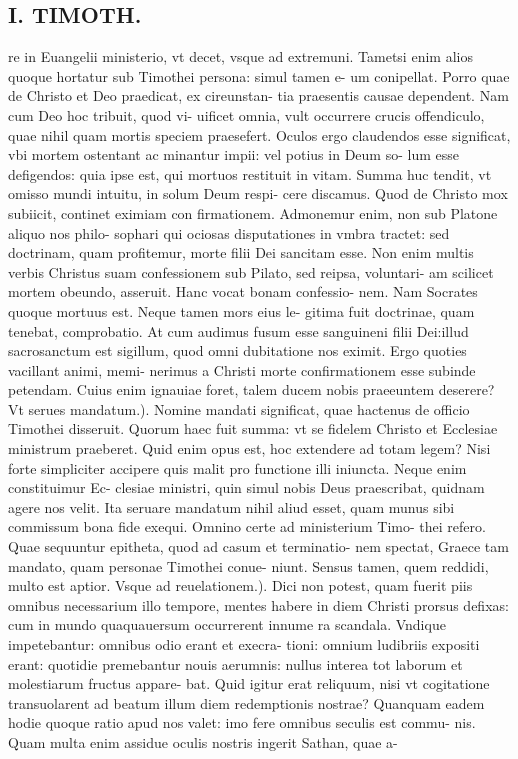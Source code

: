 \documentclass{article}
\begin{document}
\begin{pages}
\section*{I. TIMOTH. }
\marginpar{[ p.80 ]}\pstart re in Euangelii ministerio, vt decet, vsque ad extremuni. Tametsi enim alios quoque hortatur sub Timothei persona: simul tamen e- um conipellat. Porro quae de Christo et Deo praedicat, ex cireunstan- tia praesentis causae dependent. Nam cum Deo hoc tribuit, quod vi- uificet omnia, vult occurrere crucis offendiculo, quae nihil quam mortis speciem praesefert. Oculos ergo claudendos esse significat, vbi mortem ostentant ac minantur impii: vel potius in Deum so- lum esse defigendos: quia ipse est, qui mortuos restituit in vitam. Summa huc tendit, vt omisso mundi intuitu, in solum Deum respi- cere discamus. Quod de Christo mox subiicit, continet eximiam con firmationem. Admonemur enim, non sub Platone aliquo nos philo- sophari qui ociosas disputationes in vmbra tractet: sed doctrinam, quam profitemur, morte filii Dei sancitam esse. Non enim multis verbis Christus suam confessionem sub Pilato, sed reipsa, voluntari- am scilicet mortem obeundo, asseruit. Hanc vocat bonam confessio- nem. Nam Socrates quoque mortuus est. Neque tamen mors eius le- gitima fuit doctrinae, quam tenebat, comprobatio. At cum audimus fusum esse sanguineni filii Dei:illud sacrosanctum est sigillum, quod omni dubitatione nos eximit. Ergo quoties vacillant animi, memi- nerimus a Christi morte confirmationem esse subinde petendam. Cuius enim ignauiae foret, talem ducem nobis praeeuntem deserere?  \pend\pstart Vt serues mandatum.). Nomine mandati significat, quae hactenus de officio Timothei disseruit. Quorum haec fuit summa: vt se fidelem Christo et Ecclesiae ministrum praeberet. Quid enim opus est, hoc extendere ad totam legem? Nisi forte simpliciter accipere quis malit pro functione illi iniuncta. Neque enim constituimur Ec- clesiae ministri, quin simul nobis Deus praescribat, quidnam agere nos velit. Ita seruare mandatum nihil aliud esset, quam munus sibi commissum bona fide exequi. Omnino certe ad ministerium Timo- thei refero. Quae sequuntur epitheta, quod ad casum et terminatio- nem spectat, Graece tam mandato, quam personae Timothei conue- niunt. Sensus tamen, quem reddidi, multo est aptior.  \pend\pstart Vsque ad reuelationem.). Dici non potest, quam fuerit piis omnibus necessarium illo tempore, mentes habere in diem Christi prorsus defixas: cum in mundo quaquauersum occurrerent innume ra scandala. Vndique impetebantur: omnibus odio erant et execra- tioni: omnium ludibriis expositi erant: quotidie premebantur nouis aerumnis: nullus interea tot laborum et molestiarum fructus appare- bat. Quid igitur erat reliquum, nisi vt cogitatione transuolarent ad beatum illum diem redemptionis nostrae? Quanquam eadem hodie quoque ratio apud nos valet: imo fere omnibus seculis est commu- nis. Quam multa enim assidue oculis nostris ingerit Sathan, quae a-  \pend

\end{pages}
\end{document}
